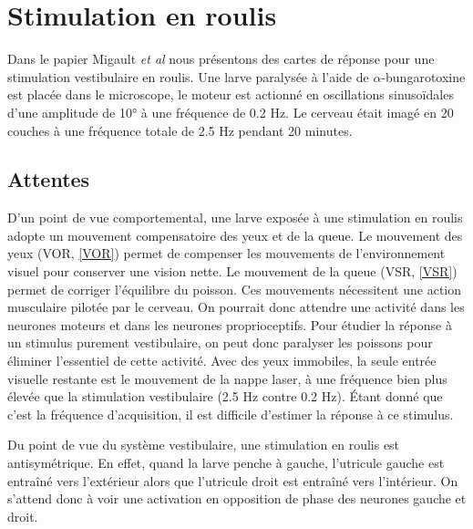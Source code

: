 


\section{Stimulation en roulis}

Dans le papier Migault \emph{et al} \cite{migault_whole-brain_2018} nous présentons des cartes de réponse pour une stimulation vestibulaire en roulis. Une larve paralysée à l'aide de $\alpha$-bungarotoxine est placée dans le microscope, le moteur est actionné en oscillations sinusoïdales d'une amplitude de 10° à une fréquence de 0.2 Hz. Le cerveau était imagé en 20 couches à une fréquence totale de 2.5 Hz pendant 20 minutes.


\subsection{Attentes}

D'un point de vue comportemental, une larve exposée à une stimulation en roulis adopte un mouvement compensatoire des yeux et de la queue. Le mouvement des yeux (VOR, \ref{VOR}) permet de compenser les mouvements de l'environnement visuel pour conserver une vision nette. Le mouvement de la queue (VSR, \ref{VSR}) permet de corriger l'équilibre du poisson. Ces mouvements nécessitent une action musculaire pilotée par le cerveau. On pourrait donc attendre une activité dans les neurones moteurs et dans les neurones proprioceptifs. Pour étudier la réponse à un stimulus purement vestibulaire, on peut donc paralyser les poissons pour éliminer l'essentiel de cette activité.
Avec des yeux immobiles, la seule entrée visuelle restante est le mouvement de la nappe laser, à une fréquence bien plus élevée que la stimulation vestibulaire (2.5 Hz contre 0.2 Hz). Étant donné que c'est la fréquence d'acquisition, il est difficile d'estimer la réponse à ce stimulus.

Du point de vue du système vestibulaire, une stimulation en roulis est antisymétrique. En effet, quand la larve penche à gauche, l'utricule gauche est entraîné vers l'extérieur alors que l'utricule droit est entraîné vers l'intérieur. On s'attend donc à voir une activation en opposition de phase des neurones gauche et droit.


